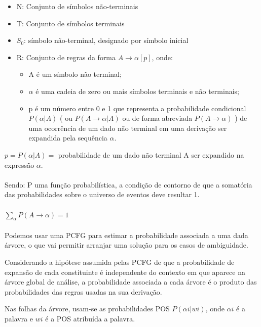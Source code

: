  \begin{itemize}

   \item N: Conjunto de símbolos não-terminais
   \item T: Conjunto de símbolos terminais
   \item $S_0$: símbolo não-terminal, designado por símbolo inicial
   \item R: Conjunto de regras da forma $ A \rightarrow \alpha [p] $, onde:

    \begin{itemize}
      \item A é um símbolo não terminal;
      \item  $\alpha$ é uma cadeia de zero ou mais símbolos terminais e não terminais;
      \item p é um número entre 0 e 1 que representa a probabilidade condicional $P(\alpha | A)$ ( ou $P(A \rightarrow \alpha | A)$  ou de forma abreviada $P(A \rightarrow \alpha)$ ) de uma ocorrência de um dado não terminal em uma derivação ser expandida pela sequência $\alpha$.
    \end{itemize}

 \end{itemize}


$p=P(\alpha |A) = $ probabilidade de um dado não terminal A ser expandido na expressão $ \alpha. $
\\ \\

Sendo: P uma função probabilística, a condição de contorno de que a somatória das probabilidades sobre o universo de eventos deve resultar  1.
\\ \\
$\sum_\alpha P(A \rightarrow \alpha)=1 $
\\ \\

Podemos usar uma PCFG para estimar a probabilidade associada a uma dada árvore, o que vai permitir arranjar uma solução para os casos de ambiguidade. 

Considerando a hipótese assumida pelas PCFG de que a probabilidade de expansão de cada constituinte é independente do contexto em que aparece na árvore global de análise, a probabilidade associada a cada árvore é o produto das probabilidades das regras usadas na sua derivação.

Nas folhas da árvore, usam-se as probabilidades POS $P(\alpha i|wi)$, onde  $\alpha i$ é a palavra e $wi$ é a POS atribuída a palavra.

